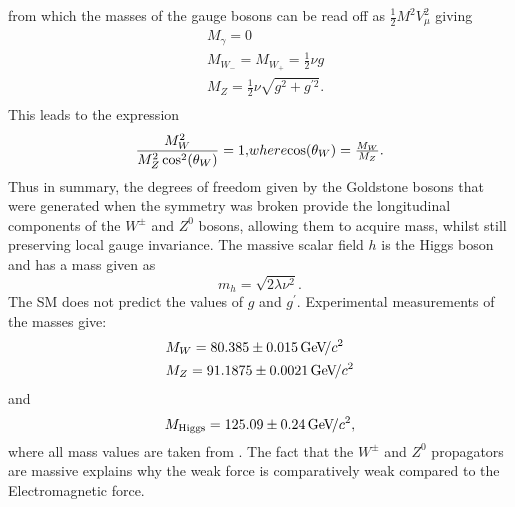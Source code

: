 from which the masses of the gauge bosons can be read off as $\frac{1}{2}M^{2}V_{\mu}^{2}$ giving
\begin{equation}
  \begin{split}
    &M_{\gamma} = 0\\
    &M_{W_{-}} = M_{W_{+}} = \frac{1}{2}\nu g\\
    &M_{Z} =  \frac{1}{2}\nu\sqrt{g^{2}+g^{\prime 2}}. \\
  \end{split}
\end{equation}
This leads to the expression
\begin{equation}
  \frac{M_{W}^{2}}{M_{Z}^{2}\cos^{2}(\theta_{W})}  = 1, $$where$$
  \cos(\theta_{W}) =  \frac{M_{W}}{M_{Z}}.
\end{equation}
Thus in summary, the degrees of freedom given by the Goldstone bosons that were generated when the symmetry was broken provide the longitudinal components of the $W^{\pm}$ and $Z^{0}$ bosons, allowing them to acquire mass, whilst still preserving local gauge invariance. The massive scalar field $h$ is the Higgs boson and has a mass given as
\begin{equation}
  m_{h} = \sqrt{2\lambda\nu^{2}}.
  \end{equation}
The SM does not predict the values of $g$ and $g^{\prime}$. Experimental measurements of the masses give:
\begin{equation}
  \begin{split}
  &M_{W} = 80.385 \pm 0.015 {\mathrm{\,Ge\kern -0.1em V\!/}c^2}\\
    &M_{Z} = 91.1875 \pm 0.0021 {\mathrm{\,Ge\kern -0.1em V\!/}c^2}\\
    \end{split}
\end{equation}
and
\begin{equation}
  M_{\text{Higgs}} = 125.09\pm0.24 {\mathrm{\,Ge\kern -0.1em V\!/}c^2},
\end{equation}
where all mass values are taken from \cite{pdg}. The fact that the $W^{\pm}$ and $Z^{0}$ propagators are massive explains why the weak force is comparatively weak compared to the Electromagnetic force.
